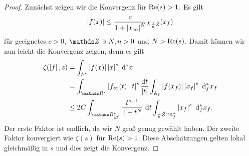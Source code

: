 \begin{proof}
Zunächst zeigen wir die Konvergenz für $\operatorname{Re}(s)>1$.
Es gilt
\begin{align*}
\left\vert f(x)\right\vert \leq \frac{c}{1+\left\vert x_\infty\right\vert^N} \chi_{\frac{1}{n}\hat{Z}} (x_f)
\end{align*}
für geeignetes $c>0$, $\Z \ni N,n>0$ und $N>\operatorname{Re}(s)$.
Damit können wir nun leicht die Konvergenz zeigen, denn es gilt
\begin{align*}
\zeta(\abs{f},s)&=\int_{\A^\ast} \abs{f(x)} \abs{x}^s~\mathrm{d}^\ast x\\
&=\int_{\R^\ast} \abs{f_\infty(t)}\abs{t}^{s} \frac{\mathrm{d}t}{\abs{t}} \int_{\A_f} \abs{f(x_f)}\abs{x_f}^s ~\mathrm{d}_f^\ast x_f\\
&\leq 2C \int_{\R_{\geq 0}^\ast} \frac{t^{s-1}}{1+t^N}~\mathrm{d}t\int_{\frac{1}{n}\hat{Z}\cap \A_f^\ast} \abs{x_f}^s~\mathrm{d}_f^\ast x_f.
\end{align*}
Der erste Faktor ist endlich, da wir $N$ groß genug gewählt haben.
Der zweite Faktor konvergiert wie $\zeta(s)$ für $\operatorname{Re}(s)>1$.
Diese Abschätzungen gelten lokal gleichmäßig in $s$ und dies zeigt die Konvergenz.


\end{proof}
